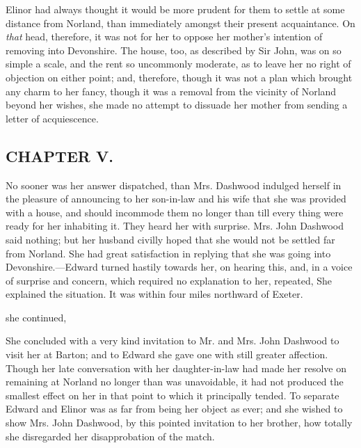 Elinor had always thought it would be more prudent for them to settle at some distance from Norland, than immediately amongst their present acquaintance. On {\em that} head, therefore, it was not for her to oppose her mother's intention of removing into Devonshire. The house, too, as described by Sir John, was on so simple a scale, and the rent so uncommonly moderate, as to leave her no right of objection on either point; and, therefore, though it was not a plan which brought any charm to her fancy, though it was a removal from the vicinity of Norland beyond her wishes, she made no attempt to dissuade her mother from sending a letter of acquiescence.

\subsection[chapter-v.]{\useURL[url5][][][]\from[url5]CHAPTER V.}

No sooner was her answer dispatched, than Mrs. Dashwood indulged herself in the pleasure of announcing to her son-in-law and his wife that she was provided with a house, and should incommode them no longer than till every thing were ready for her inhabiting it. They heard her with surprise. Mrs. John Dashwood said nothing; but her husband civilly hoped that she would not be settled far from Norland. She had great satisfaction in replying that she was going into Devonshire.---Edward turned hastily towards her, on hearing this, and, in a voice of surprise and concern, which required no explanation to her, repeated,  She explained the situation. It was within four miles northward of Exeter.

 she continued, 

She concluded with a very kind invitation to Mr. and Mrs. John Dashwood to visit her at Barton; and to Edward she gave one with still greater affection. Though her late conversation with her daughter-in-law had made her resolve on remaining at Norland no longer than was unavoidable, it had not produced the smallest effect on her in that point to which it principally tended. To separate Edward and Elinor was as far from being her object as ever; and she wished to show Mrs. John Dashwood, by this pointed invitation to her brother, how totally she disregarded her disapprobation of the match.

